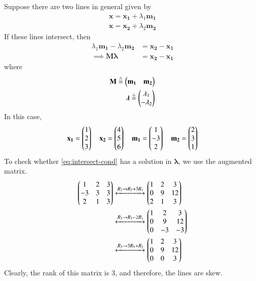 \documentclass[journal,12pt,twocolumn]{IEEEtran}
\renewcommand{\vec}[1]{\boldsymbol{\mathbf{#1}}}
\begin{document}
\begin{enumerate}
    \solution Suppose there are two lines in general given by
    \begin{align}
        \vec{x} = \vec{x_1} + \lambda_1\vec{m_1} \label{eq:L1-gen} \\
        \vec{x} = \vec{x_2} + \lambda_2\vec{m_2} \label{eq:L2-gen}
    \end{align}
    If these lines intersect, then
    \begin{align}
        \lambda_1\vec{m_1} - \lambda_2\vec{m_2} &= \vec{x_2} - \vec{x_1} \\
        \implies \vec{M}\vec{\lambda} &= \vec{x_2} - \vec{x_1}
        \label{eq:intersect-cond}
    \end{align}
    where
    \begin{align}
        \vec{M} \define \myvec{\vec{m_1} & \vec{m_2}} \label{eq:M-def} \\
        \vec{\lambda} \define \myvec{\lambda_1\\-\lambda_2}
        \label{eq:lambda-def}
    \end{align}
    In this case,
    \begin{align}
        \vec{x_1} = \myvec{1\\2\\3} \quad \vec{x_2} = \myvec{4\\5\\6}
        \quad \vec{m_1} = \myvec{1\\-3\\2} \quad \vec{m_2} = \myvec{2\\3\\1}
        \label{eq:vals}
    \end{align}
    To check whether \eqref{eq:intersect-cond} has a solution in $\vec{\lambda}$,
    we use the augmented matrix.
    \begin{align}
        \begin{pmatrix}1&2&3\\-3&3&3\\2&1&3\end{pmatrix} &\xleftrightarrow[]{R_2\rightarrow R_2+3R_1} \begin{pmatrix}1&2&3\\0&9&12\\2&1&3\end{pmatrix} \\
                &\xleftrightarrow[]{R_3\rightarrow R_3-2R_1} \begin{pmatrix}1&2&3\\0&9&12\\0&-3&-3\end{pmatrix} \\
                &\xleftrightarrow[]{R_3\rightarrow 3R_3+R_2} \begin{pmatrix}1&2&3\\0&9&12\\0&0&3\end{pmatrix}
                \label{eq:rank-aug}
    \end{align}
    Clearly, the rank of this matrix is 3, and therefore, the lines are skew.


\end{enumerate}
\end{document}
